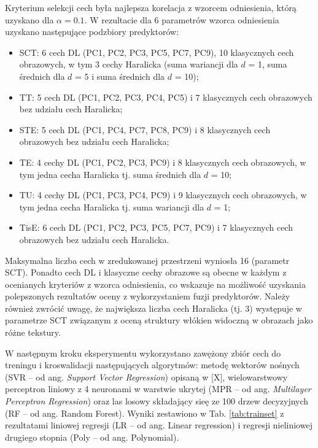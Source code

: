 Kryterium selekcji cech była najlepsza korelacja z wzorcem odniesienia, którą uzyskano dla  $\alpha=0.1$. W rezultacie dla 6 parametrów wzorca odniesienia uzyskano następujące podzbiory predyktorów:  
\begin{itemize}
	\item SCT: 6 cech DL (PC1, PC2, PC3, PC5, PC7, PC9), 10 klasycznych cech obrazowych, w tym 3 cechy Haralicka (suma wariancji dla $d$ = 1, suma średnich dla $d$ = 5 i suma średnich dla $d$ = 10);
	\item TT: 5 cech DL (PC1, PC2, PC3, PC4, PC5) i 7 klasycznych cech obrazowych bez udziału cech Haralicka;
	\item STE: 5 cech DL (PC1, PC4, PC7, PC8, PC9) i 8 klasycznych cech obrazowych bez udziału cech Haralicka;
	\item TE: 4 cechy DL (PC1, PC2, PC3, PC9) i 8 klasycznych cech obrazowych, w tym jedna cecha Haralicka tj. suma średnich dla $d$ = 10;
	\item TU: 4 cechy DL (PC1, PC3, PC4, PC9) i 9 klasycznych cech obrazowych, w tym jedna cecha Haralicka tj. suma wariancji dla $d$ = 1;  
	\item TisE: 6 cech DL (PC1, PC2, PC3, PC5, PC7, PC9) i 7 klasycznych cech obrazowych bez udziału cech Haralicka.
	
\end{itemize}
Maksymalna liczba cech w zredukowanej przestrzeni wyniosła 16 (parametr SCT). Ponadto cech DL i klasyczne cechy obrazowe są obecne w każdym z ocenianych kryteriów z wzorca odniesienia, co wskazuje na możliwość uzyskania polepszonych rezultatów oceny z wykorzystaniem fuzji predyktorów. Należy również zwrócić uwagę, że największa liczba cech Haralicka (tj. 3) występuje w parametrze SCT związanym z oceną struktury włókien widoczną w obrazach jako różne tekstury.

W następnym kroku eksperymentu wykorzystano zawężony zbiór cech do treningu i kroswalidacji następujących algorytmów:  metodę wektorów nośnych (SVR -- od ang. \textit{Support Vector Regression}) opisaną w [X], wielowarstwowy perceptron liniowy z 4 neuronami w warstwie ukrytej (MPR -- od ang. \textit{Multilayer Perceptron Regression}) oraz las losowy składający sieę ze 100 drzew decyzyjnych (RF -- od ang. Random Forest). Wyniki zestawiono w Tab. \ref{tab:trainset} z rezultatami liniowej regresji (LR -- od ang. Linear regression) i regresji nieliniowej drugiego stopnia (Poly -- od ang. Polynomial). 

